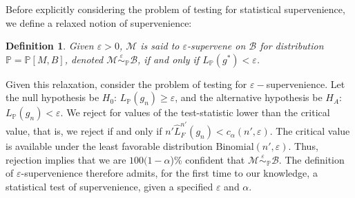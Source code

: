 \documentclass{article}
\newcommand{\mB}{\mathcal{B}}
\newcommand{\mM}{\mathcal{M}}
\newcommand{\PP}{\mathbb{P}}           %
\newcommand{\eps}{\varepsilon}
\providecommand{\mc}[1]{\mathcal{#1}}
\newcommand{\hL}{\widehat{L}}
\newcommand{\MeB}{\mM \overset{\varepsilon}{{\sim}}_{\PP} \mB}
\newtheorem{defi}{Definition}
\begin{document}
Before explicitly considering the problem of testing for statistical supervenience, we define a relaxed notion of supervenience:
\begin{defi}
\label{def2}
Given $\varepsilon > 0$, $\mM$ is said to $\varepsilon$-\textit{supervene} on $\mB$ for distribution $\PP=\PP[M,B]$, denoted $\MeB$, if and only if $L_{\PP}(g^*) < \varepsilon$.
\end{defi}

Given this relaxation, consider the problem of testing for $\eps-$supervenience.  %
Let the null hypothesis be $H_0$: $L_{\PP}(g_n) \geq \eps$, and the alternative hypothesis be $H_A$: $L_{\PP}(g_n) < \eps$.  We reject for  values of the test-statistic lower than the critical value, that is, we reject if and only if $n' \hL^{n'}_{F}(g_n) <c_{\alpha}(n',\varepsilon)$.  The critical value is available under the least favorable distribution $\text{Binomial}(n',\varepsilon)$.  Thus, rejection implies that we are $100(1-\alpha$)\% confident that $\MeB$.  The definition of $\eps$-supervenience therefore admits, for the first time to our knowledge, a statistical test of supervenience, given a specified $\eps$ and $\alpha$. %



	
	
\end{document}
